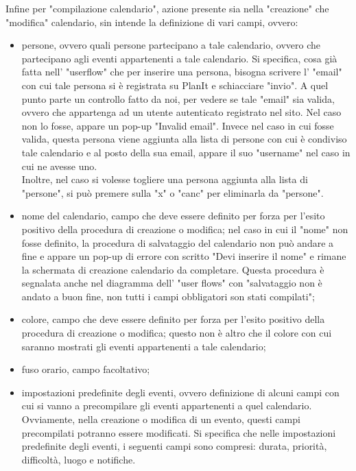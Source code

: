 Infine per "compilazione calendario", azione presente sia nella "creazione" che "modifica" calendario, sin intende la definizione di vari campi, ovvero:
\begin{itemize}
    \item persone, ovvero quali persone partecipano a tale calendario, ovvero che partecipano agli eventi appartenenti a tale calendario. Si specifica, cosa già fatta nell' "userflow" che per inserire una persona, bisogna scrivere l' "email" con cui tale persona si è registrata su PlanIt e schiacciare "invio". A quel punto parte un controllo fatto da noi, per vedere se tale "email" sia valida, ovvero che appartenga ad un utente autenticato registrato nel sito. Nel caso non lo fosse, appare un pop-up "Invalid email". Invece nel caso in cui fosse valida, questa persona viene aggiunta alla lista di persone con cui è condiviso tale calendario e al posto della sua email, appare il suo "username" nel caso in cui ne avesse uno. \\
          Inoltre, nel caso si volesse togliere una persona aggiunta alla lista di "persone", si può premere sulla "x" o "canc" per eliminarla da "persone".
    \item nome del calendario, campo che deve essere definito per forza per l'esito positivo della procedura di creazione o modifica; nel caso in cui il "nome" non fosse definito, la procedura di salvataggio del calendario non può andare a fine e appare un pop-up di errore con scritto "Devi inserire il nome" e rimane la schermata di creazione calendario da completare. Questa procedura è segnalata anche nel diagramma dell' "user flows" con "salvataggio non è andato a buon fine, non tutti i campi obbligatori son stati compilati";
    \item colore, campo che deve essere definito per forza per l'esito positivo della procedura di creazione o modifica; questo non è altro che il colore con cui saranno mostrati gli eventi appartenenti a tale calendario;
    \item fuso orario, campo facoltativo;
    \item impostazioni predefinite degli eventi, ovvero definizione di alcuni campi con cui si vanno a precompilare gli eventi appartenenti a quel calendario. Ovviamente, nella creazione o modifica di un evento, questi campi precompilati potranno essere modificati. Si specifica che nelle impostazioni predefinite degli eventi, i seguenti campi sono compresi: durata, priorità, difficoltà, luogo e notifiche.
\end{itemize}
